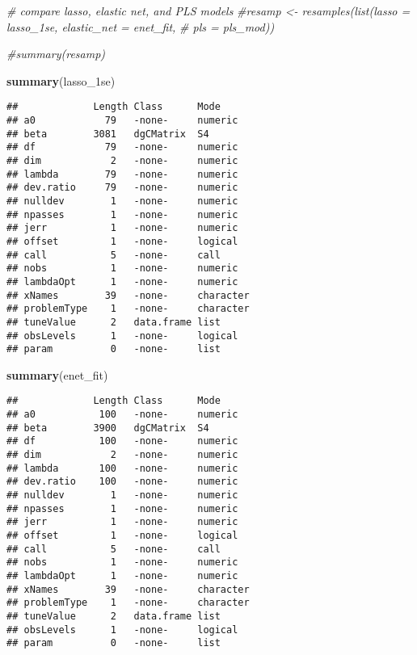 \documentclass[
]{article}
\newenvironment{Shaded}{\begin{snugshade}}{\end{snugshade}}
\newcommand{\CommentTok}[1]{\textcolor[rgb]{0.56,0.35,0.01}{\textit{#1}}}
\newcommand{\FunctionTok}[1]{\textcolor[rgb]{0.13,0.29,0.53}{\textbf{#1}}}
\newcommand{\NormalTok}[1]{#1}
\begin{document}
\begin{Shaded}
\begin{Highlighting}[]
\CommentTok{\# compare lasso, elastic net, and PLS models}
\CommentTok{\#resamp \textless{}{-} resamples(list(lasso = lasso\_1se, elastic\_net = enet\_fit,}
  \CommentTok{\#                  pls = pls\_mod))}

\CommentTok{\#summary(resamp)}
\end{Highlighting}
\end{Shaded}

\begin{Shaded}
\begin{Highlighting}[]
\FunctionTok{summary}\NormalTok{(lasso\_1se)}
\end{Highlighting}
\end{Shaded}

\begin{verbatim}
##             Length Class      Mode     
## a0            79   -none-     numeric  
## beta        3081   dgCMatrix  S4       
## df            79   -none-     numeric  
## dim            2   -none-     numeric  
## lambda        79   -none-     numeric  
## dev.ratio     79   -none-     numeric  
## nulldev        1   -none-     numeric  
## npasses        1   -none-     numeric  
## jerr           1   -none-     numeric  
## offset         1   -none-     logical  
## call           5   -none-     call     
## nobs           1   -none-     numeric  
## lambdaOpt      1   -none-     numeric  
## xNames        39   -none-     character
## problemType    1   -none-     character
## tuneValue      2   data.frame list     
## obsLevels      1   -none-     logical  
## param          0   -none-     list
\end{verbatim}

\begin{Shaded}
\begin{Highlighting}[]
\FunctionTok{summary}\NormalTok{(enet\_fit)}
\end{Highlighting}
\end{Shaded}

\begin{verbatim}
##             Length Class      Mode     
## a0           100   -none-     numeric  
## beta        3900   dgCMatrix  S4       
## df           100   -none-     numeric  
## dim            2   -none-     numeric  
## lambda       100   -none-     numeric  
## dev.ratio    100   -none-     numeric  
## nulldev        1   -none-     numeric  
## npasses        1   -none-     numeric  
## jerr           1   -none-     numeric  
## offset         1   -none-     logical  
## call           5   -none-     call     
## nobs           1   -none-     numeric  
## lambdaOpt      1   -none-     numeric  
## xNames        39   -none-     character
## problemType    1   -none-     character
## tuneValue      2   data.frame list     
## obsLevels      1   -none-     logical  
## param          0   -none-     list
\end{verbatim}
\end{document}
